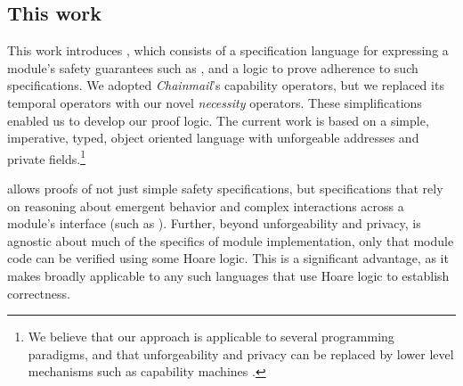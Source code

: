 {\subsection{This work}
This work introduces \Nec, which consists of a specification language for expressing a module's safety guarantees such as \SrobustB, and a logic 
to prove adherence to such specifications.
We adopted %
\emph{Chainmail}'s %
  capability operators, 
but we replaced its temporal operators with  {our novel}
  \emph{necessity} operators. 
  These simplifications enabled us to develop our proof logic. 
The current work is based on a simple, imperative, typed, object oriented
language with unforgeable addresses and private fields.\footnote{We believe
 that our approach is applicable to several programming paradigms, and 
 that   unforgeability and privacy
 can be replaced 
 by lower level mechanisms such as capability machines \cite{vanproving,davis2019cheriabi}.
  }

 \Nec allows proofs of not just simple safety 
specifications, but specifications that rely on reasoning about emergent behavior and complex interactions 
across a module's interface (such as \SrobustB).
Further, beyond unforgeability and privacy, \Nec is agnostic about much of the specifics
of module implementation, only that module code can be verified using some Hoare logic. This is a significant advantage, as it makes \Nec broadly applicable to any such languages that use Hoare logic to establish correctness.


}
